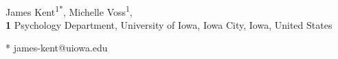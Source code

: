 \documentclass[10pt,letterpaper]{article}
\begin{document}
\vspace*{0.2in}

\begin{flushleft}
{\Large
\textbf{} %
}
\newline
\\
James Kent\textsuperscript{1*},
Michelle Voss\textsuperscript{1},
\\
\bigskip
\textbf{1} Psychology Department, University of Iowa, Iowa City, Iowa, United States
\bigskip

% 
%





* james-kent@uiowa.edu

\end{flushleft}
\end{document}
